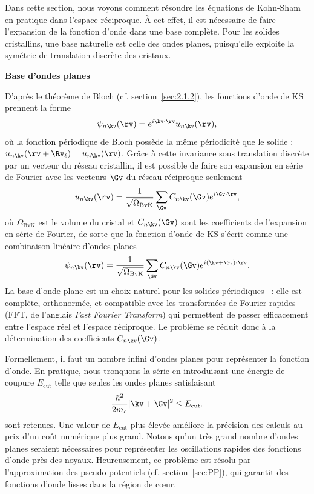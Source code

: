 Dans cette section, nous voyons comment résoudre les équations de Kohn-Sham en pratique dans l'espace réciproque. À cet effet, il est nécessaire de faire l'expansion de la fonction d'onde dans une base complète. Pour les solides cristallins, une base naturelle est celle des ondes planes, puisqu'elle exploite la symétrie de translation discrète des cristaux.

\noindent\textbf{Base d'ondes planes}

D'après le théorème de Bloch (cf. section~\ref{sec:2.1.2}), les fonctions d'onde de KS prennent la forme
\begin{equation}
    \psi_{n\kv}(\rv)=e^{i\kv\cdot\rv}u_{n\kv}(\rv),
    \label{eqn:c2_bloch_pt2}
\end{equation}
où la fonction périodique de Bloch possède la même périodicité que le solide : $u_{n\kv}(\rv+\Rv_\ell) = u_{n\kv}(\rv)$. Grâce à cette invariance sous translation discrète par un vecteur du réseau cristallin, il est possible de faire son expansion en série de Fourier avec les vecteurs $\Gv$ du réseau réciproque seulement
\begin{equation}
    u_{n\kv}(\rv)=\frac{1}{\sqrt{\Omega_\text{BvK}}}\sum_{\Gv}C_{n\kv}(\Gv)e^{i\Gv\cdot\rv},
    \label{eqn:c2_uPW}
\end{equation}
où $\Omega_\text{BvK}$ est le volume du cristal et $C_{n\kv}(\Gv)$ sont les coefficients de l'expansion en série de Fourier, de sorte que la fonction d'onde de KS s'écrit comme une combinaison linéaire d'ondes planes
\begin{equation}
    \psi_{n\kv}(\rv)=\frac{1}{\sqrt{\Omega_\text{BvK}}}\sum_{\Gv}C_{n\kv}(\Gv)e^{i(\kv+\Gv)\cdot\rv}.
    \label{eqn:c2_psiPW}
\end{equation}
La base d'onde plane est un choix naturel pour les solides périodiques~\cite{carUnifiedApproachMolecular1985,martinElectronicStructureBasic2004} : elle est complète, orthonormée, et compatible avec les transformées de Fourier rapides (FFT, de l'anglais \textit{Fast Fourier Transform}) qui permettent de passer efficacement entre l'espace réel et l'espace réciproque. Le problème se réduit donc à la détermination des coefficients $C_{n\kv}(\Gv)$.

Formellement, il faut un nombre infini d'ondes planes pour représenter la fonction d'onde. En pratique, nous tronquons la série en introduisant une énergie de coupure $E_\text{cut}$ telle que seules les ondes planes satisfaisant
\begin{equation}
    \frac{\hbar^2}{2m_e}|\kv+\Gv|^2\leq E_\text{cut}.
    \label{eqn:c2_Ecut}
\end{equation}
sont retenues. Une valeur de $E_\text{cut}$ plus élevée améliore la précision des calculs au prix d'un coût numérique plus grand. Notons qu'un très grand nombre d'ondes planes seraient nécessaires pour représenter les oscillations rapides des fonctions d'onde près des noyaux. Heureusement, ce problème est résolu par l'approximation des pseudo-potentiels (cf. section~\ref{sec:PP}), qui garantit des fonctions d'onde lisses dans la région de c\oe ur.

